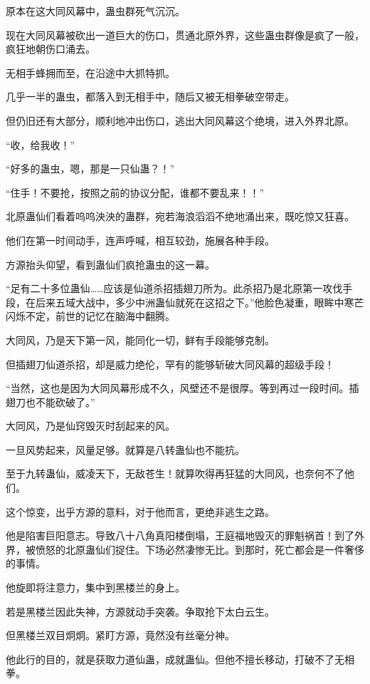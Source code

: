 
\begin{this_body}

原本在这大同风幕中，蛊虫群死气沉沉。

现在大同风幕被砍出一道巨大的伤口，贯通北原外界，这些蛊虫群像是疯了一般，疯狂地朝伤口涌去。

无相手蜂拥而至，在沿途中大抓特抓。

几乎一半的蛊虫，都落入到无相手中，随后又被无相拳破空带走。

但仍旧还有大部分，顺利地冲出伤口，逃出大同风幕这个绝境，进入外界北原。

“收，给我收！”

“好多的蛊虫，嗯，那是一只仙蛊？！”

“住手！不要抢，按照之前的协议分配，谁都不要乱来！！”

北原蛊仙们看着呜呜泱泱的蛊群，宛若海浪滔滔不绝地涌出来，既吃惊又狂喜。

他们在第一时间动手，连声呼喊，相互较劲，施展各种手段。

方源抬头仰望，看到蛊仙们疯抢蛊虫的这一幕。

“足有二十多位蛊仙……应该是仙道杀招插翅刀所为。此杀招乃是北原第一攻伐手段，在后来五域大战中，多少中洲蛊仙就死在这招之下。”他脸色凝重，眼眸中寒芒闪烁不定，前世的记忆在脑海中翻腾。

大同风，乃是天下第一风，能同化一切，鲜有手段能够克制。

但插翅刀仙道杀招，却是威力绝伦，罕有的能够斩破大同风幕的超级手段！

“当然，这也是因为大同风幕形成不久，风壁还不是很厚。等到再过一段时间。插翅刀也不能砍破了。”

大同风，乃是仙窍毁灭时刮起来的风。

一旦风势起来，风量足够。就算是八转蛊仙也不能抗。

至于九转蛊仙，威凌天下，无敌苍生！就算吹得再狂猛的大同风，也奈何不了他们。

这个惊变，出乎方源的意料，对于他而言，更绝非逃生之路。

他是陷害巨阳意志。导致八十八角真阳楼倒塌，王庭福地毁灭的罪魁祸首！到了外界，被愤怒的北原蛊仙们捉住。下场必然凄惨无比。到那时，死亡都会是一件奢侈的事情。

他旋即将注意力，集中到黑楼兰的身上。

若是黑楼兰因此失神，方源就动手突袭。争取抢下太白云生。

但黑楼兰双目炯炯。紧盯方源，竟然没有丝毫分神。

他此行的目的，就是获取力道仙蛊，成就蛊仙。但他不擅长移动，打破不了无相拳。


\end{this_body}
